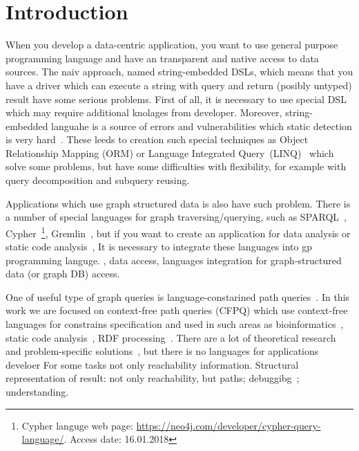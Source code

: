 \section{Introduction}

When you develop a data-centric application, you want to use general purpose programming language and have an transparent and native access to data sources.
The naiv approach, named string-embedded DSLs, which means that you have a driver which can execute a string with query and return (posibly untyped) result have some serious problems.
First of all, it is necessary to use special DSL which may require additional knolages from developer.
Moreover, string-embedded languahe is a source of errors and vulnerabilities which static detection is very hard~\cite{stringEmbeddedLanguagesProblem}.  
These leeds to creation such special techniques as Object Relationship Mapping (ORM) or Language Integrated Query~(LINQ)~\cite{LINQ1, LINQ2} which solve some problems, but have some difficulties with flexibility, for example with query decomposition and subquery reusing.


Applications which use graph structured data is also have such problem. 
There is a number of special languages for graph traversing/querying,
 such as SPARQL~\cite{sparql}, Cypher~\footnote{Cypher languge web page: \url{https://neo4j.com/developer/cypher-query-language/}. Access date: 16.01.2018}, Gremlin~\cite{gremlin},
 but if you want to create an application for data analysis or static code analysis~\cite{!!!}, 
It is necessary to integrate these languages into gp programming languge.
, data access, languages integration for graph-structured data (or graph DB) access.

One of useful type of graph queries is language-constarined path queries~\cite{FLCpathProblem}.
In this work we are focused on context-free path queries (CFPQ) which use context-free languages for constrains specification and used in such areas as bioinformatics~\cite{GraphQueryWithEarley}, static code analysis~\cite{Reps, Zheng, LabelFlowCFLReachability, specificationCFLReachability}, RDF processing~\cite{CFGonRDF}. 
There are a lot of theoretical research~\cite{Yannakakis, ConjCFPathQuery, Hellings16} and problem-specific solutions~\cite{QueryGraphWithData, RegularDBQuery, GraphQueryWithEarley, graphDB}, but there is no languages for applications develoer
For some tasks not only reachability information. 
Structural representation of result: not only reachability, but paths; debuggibg~\cite{structForDebugging}; understanding.

